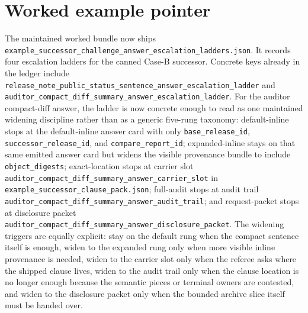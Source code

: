 \documentclass[11pt]{article}
\begin{document}
\section{Worked example pointer}
The maintained worked bundle now ships \nolinkurl{example_successor_challenge_answer_escalation_ladders.json}.\cite{series:workedexample}
It records four escalation ladders for the canned Case-B successor.
Concrete keys already in the ledger include \nolinkurl{release_note_public_status_sentence_answer_escalation_ladder} and \nolinkurl{auditor_compact_diff_summary_answer_escalation_ladder}.
For the auditor compact-diff answer, the ladder is now concrete enough to read as one maintained widening discipline rather than as a generic five-rung taxonomy: \textsf{default-inline} stops at the default-inline answer card with only \nolinkurl{base\_release\_id}, \nolinkurl{successor\_release\_id}, and \nolinkurl{compare\_report\_id}; \textsf{expanded-inline} stays on that same emitted answer card but widens the visible provenance bundle to include \nolinkurl{object\_digests}; \textsf{exact-location} stops at carrier slot \nolinkurl{auditor_compact_diff_summary_answer_carrier_slot} in \nolinkurl{example_successor_clause_pack.json}; \textsf{full-audit} stops at audit trail \nolinkurl{auditor_compact_diff_summary_answer_audit_trail}; and \textsf{request-packet} stops at disclosure packet \nolinkurl{auditor_compact_diff_summary_answer_disclosure_packet}. The widening triggers are equally explicit: stay on the default rung when the compact sentence itself is enough, widen to the expanded rung only when more visible inline provenance is needed, widen to the carrier slot only when the referee asks where the shipped clause lives, widen to the audit trail only when the clause location is no longer enough because the semantic pieces or terminal owners are contested, and widen to the disclosure packet only when the bounded archive slice itself must be handed over.
\end{document}
